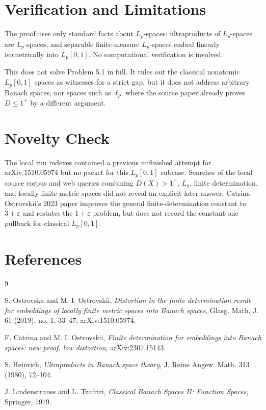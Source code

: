 \documentclass[11pt]{article}
\newcommand{\eps}{\varepsilon}
\begin{document}
\section*{Verification and Limitations}

The proof uses only standard facts about \(L_p\)-spaces: ultraproducts of
\(L_p\)-spaces are \(L_p\)-spaces, and separable finite-measure \(L_p\)-spaces
embed linearly isometrically into \(L_p[0,1]\).  No computational verification
is involved.

This does not solve Problem 5.1 in full.  It rules out the classical nonatomic
\(L_p[0,1]\) spaces as witnesses for a strict gap, but it does not address
arbitrary Banach spaces, nor spaces such as \(\ell_p\) where the source paper
already proves \(D\le 1^+\) by a different argument.

\section*{Novelty Check}

The local run indexes contained a previous unfinished attempt for arXiv:1510.05974
but no packet for this \(L_p[0,1]\) subcase.  Searches of the local source
corpus and web queries combining \(D(X)>1^+\), \(L_p\), finite determination,
and locally finite metric spaces did not reveal an explicit later answer.
Catrina--Ostrovskii's 2023 paper
improves the general finite-determination constant to \(3+\eps\) and restates
the \(1+\eps\) problem, but does not record the constant-one pullback for
classical \(L_p[0,1]\).

\section*{References}

\begin{thebibliography}{9}

S. Ostrovska and M. I. Ostrovskii,
\emph{Distortion in the finite determination result for embeddings of locally
finite metric spaces into Banach spaces},
Glasg. Math. J. 61 (2019), no. 1, 33--47; arXiv:1510.05974.

F. Catrina and M. I. Ostrovskii,
\emph{Finite determination for embeddings into Banach spaces: new proof, low
distortion},
arXiv:2307.15143.

S. Heinrich,
\emph{Ultraproducts in Banach space theory},
J. Reine Angew. Math. 313 (1980), 72--104.

J. Lindenstrauss and L. Tzafriri,
\emph{Classical Banach Spaces II: Function Spaces},
Springer, 1979.

\end{thebibliography}
\end{document}
